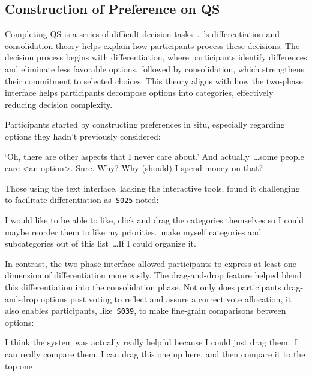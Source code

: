 \subsection{Construction of Preference on QS}

Completing QS is a series of difficult decision tasks~\textcite{lichtensteinConstructionPreference2006}.~\textcite{svensonDifferentiationConsolidationTheory1992}'s differentiation and consolidation theory helps explain how participants process these decisions. The decision process begins with differentiation, where participants identify differences and eliminate less favorable options, followed by consolidation, which strengthens their commitment to selected choices. This theory aligns with how the two-phase interface helps participants decompose options into categories, effectively reducing decision complexity.

Participants started by constructing preferences in situ, especially regarding options they hadn’t previously considered:
\begin{displayquote}
    \bracketellipsis`Oh, there are other aspects that I never care about.' And actually~\ldots some people care <an option>. Sure. Why? Why (should) I spend money on that? \\\hfill{}
\end{displayquote}

Those using the text interface, lacking the interactive tools, found it challenging to facilitate differentiation as~\texttt{S025} noted:

\begin{displayquote}
    I would like to be able to like, click and drag the categories themselves so I could maybe reorder them to like my priorities.~\bracketellipsis make myself categories and subcategories out of this list~\ldots If I could organize it. \hfill{}
\end{displayquote}

In contrast, the two-phase interface allowed participants to express at least one dimension of differentiation more easily. The drag-and-drop feature helped blend this differentiation into the consolidation phase. Not only does participants drag-and-drop options post voting to reflect and assure a correct vote allocation, it also enables participants, like~\texttt{S039}, to make fine-grain comparisons between options:

\begin{displayquote}
    I think the system was actually really helpful because I could just drag them.~\bracketellipsis I can really compare them, I can drag this one up here, and then compare it to the top one~\bracketellipsis \hfill{}
\end{displayquote}

